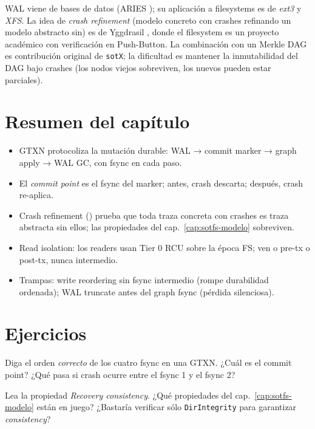 WAL viene de bases de datos (ARIES \cite{Mohan1992-ARIES}); su
aplicación a filesystems es de \emph{ext3} y \emph{XFS}. La idea
de \emph{crash refinement} (modelo concreto con crashes
refinando un modelo abstracto sin) es de Yggdrasil
\cite{Sigurbjarnarson2016-Yggdrasil}, donde el filesystem es un
proyecto académico con verificación en Push-Button. La
combinación con un Merkle DAG es contribución original de
\texttt{sotX}; la dificultad es mantener la inmutabilidad del
DAG bajo crashes (los nodos viejos sobreviven, los nuevos
pueden estar parciales).

\section*{Resumen del capítulo}

\begin{itemize}
  \item GTXN protocoliza la mutación durable: WAL → commit
    marker → graph apply → WAL GC, con fsync en cada paso.
  \item El \emph{commit point} es el fsync del marker; antes,
    crash descarta; después, crash re-aplica.
  \item Crash refinement () prueba
    que toda traza concreta con crashes es traza abstracta sin
    ellos; las propiedades del cap.~\ref{cap:sotfs-modelo}
    sobreviven.
  \item Read isolation: los readers usan Tier 0 RCU sobre la
    época FS; ven o pre-tx o post-tx, nunca intermedio.
  \item Trampas: write reordering sin fsync intermedio (rompe
    durabilidad ordenada); WAL truncate antes del graph fsync
    (pérdida silenciosa).
\end{itemize}

\section*{Ejercicios}

\begin{ejercicio}[$\star$]
Diga el orden \emph{correcto} de los cuatro fsync en una GTXN.
¿Cuál es el commit point? ¿Qué pasa si crash ocurre entre el
fsync 1 y el fsync 2?
\end{ejercicio}

\begin{ejercicio}[$\star\star$]
Lea la propiedad \emph{Recovery consistency}. ¿Qué propiedades
del cap.~\ref{cap:sotfs-modelo} están en juego? ¿Bastaría
verificar sólo \texttt{DirIntegrity} para garantizar
\emph{consistency}?
\end{ejercicio}


